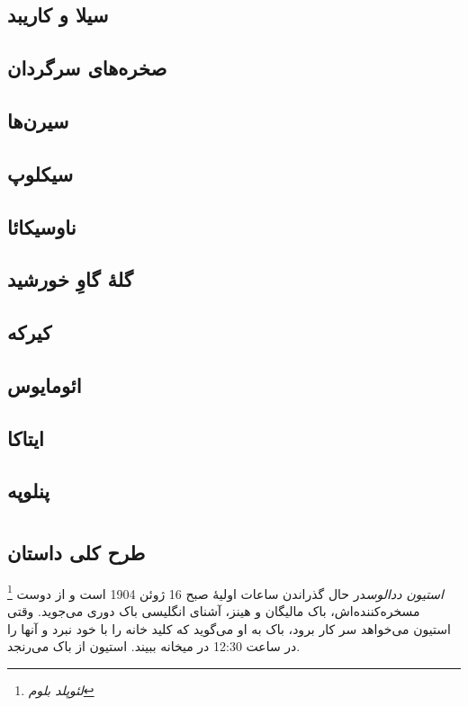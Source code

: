 \documentclass[12pt,onecolumn,a4paper]{book}
\newcommand{\LeopoldBloom}{\textit{لئوپلد بلوم}}
\newcommand{\stephen}{\textit{استیون ددالوس}}
\begin{document}
    \chapter{سیلا و کاریبد}
    \chapter{صخره‌های سرگردان}
    \chapter{سیرن‌ها}
    \chapter{سیکلوپ}
    \chapter{ناوسیکائا}
    \chapter{گلۀ گاوِ خورشید}
    \chapter{کیرکه}
    \chapter{ائومایوس}
    \chapter{ایتاکا}
    \chapter{پنلوپه}

    \part{}
    \chapter{طرح کلی داستان}
    \footnote{\LeopoldBloom}
    \stephen در حال گذراندن ساعات اولیۀ صبح 16 ژوئن 1904 است و از دوست مسخره‌کننده‌اش، باک مالیگان و هینز، آشنای انگلیسی باک دوری می‌جوید. وقتی استیون می‌خواهد سر کار برود، باک به او می‌گوید که کلید خانه را با خود نبرد و آنها را در ساعت 12:30 در میخانه ببیند. استیون از باک می‌رنجد.
\end{document}
